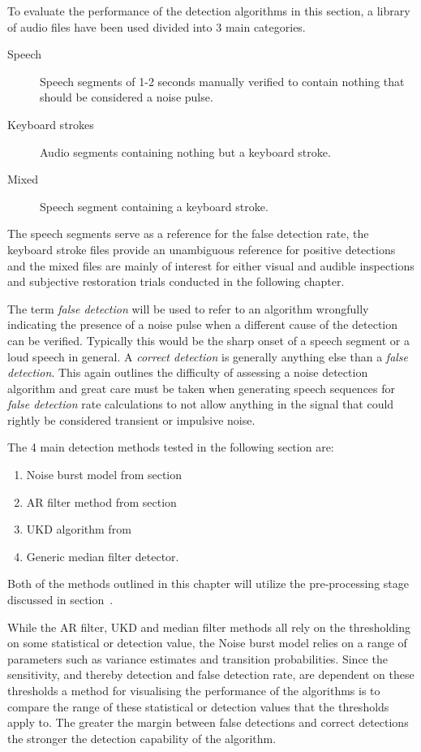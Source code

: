To evaluate the performance of the detection algorithms in this section, a library of audio files have been used divided into 3 main categories.

\begin{description}
  \item[Speech] Speech segments of 1-2 seconds manually verified to contain nothing that should be considered a noise pulse.
  \item[Keyboard strokes] Audio segments containing nothing but a keyboard stroke.
  \item[Mixed] Speech segment containing a keyboard stroke.
\end{description}

The speech segments serve as a reference for the false detection rate, the keyboard stroke files provide an unambiguous reference for positive detections and the mixed files are mainly of interest for either visual and audible inspections and subjective restoration trials conducted in the following chapter.

The term \emph{false detection} will be used to refer to an algorithm wrongfully indicating the presence of a noise pulse when a different cause of the detection can be verified. Typically this would be the sharp onset of a speech segment or a loud speech in general. A \emph{correct detection} is generally anything else than a \emph{false detection}. This again outlines the difficulty of assessing a noise detection algorithm and great care must be taken when generating speech sequences for \emph{false detection} rate calculations to not allow anything in the signal that could rightly be considered transient or impulsive noise.

The 4 main detection methods tested in the following section are:
\begin{enumerate}
  \item Noise burst model from section~\label{sec:WPdetectionNB}
  \item AR filter method from section~\label{sec:WPdetectionAR}
  \item UKD algorithm from \cite{Subramanya2007}
  \item Generic median filter detector.
\end{enumerate}
Both of the methods outlined in this chapter will utilize the pre-processing stage discussed in section~\label{sec:WPdetectionSep}.

While the AR filter, UKD and median filter methods all rely on the thresholding on some statistical or detection value, the Noise burst model relies on a range of parameters such as variance estimates and transition probabilities. Since the sensitivity, and thereby detection and false detection rate, are dependent on these thresholds a method for visualising the performance of the algorithms is to compare the range of these statistical or detection values that the thresholds apply to. The greater the margin between false detections and correct detections the stronger the detection capability of the algorithm.

